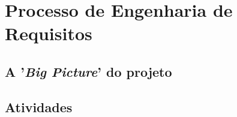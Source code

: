 \chapter[Processo de Engenharia de Requisitos]{Processo de Engenharia de Requisitos}

  \section{A '\textit{Big Picture}' do projeto}

      
    
    \pagebreak
    \section{Atividades}
	
	